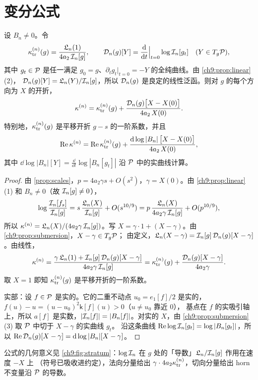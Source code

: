 \section{变分公式}\label{ch9:sec:formula}

\begin{theorem}[变分公式]\label{thm:variation}
设 $B_n\ne0$。令
\[
 \kappa_{\mathrm{tr}}^{(n)}(g)=\frac{\mathfrak L_n(1)}{4a_2\,\mathcal I_n[g]},\qquad
 \mathcal D_n(g)[Y]=\frac{\mathrm{d}}{\mathrm{d} t}\Big|_{t=0}\log\mathcal I_n[g_t]\quad(Y\in T_g\mathcal P),
\]
其中 $g_t\in\mathcal P$ 是任一满足 $g_0=g$、$\partial_tg_t|_{t=0}=-Y$ 的全纯曲线。由 \cref{ch9:prop:linear}(2)，
$\mathcal D_n(g)[Y]=\mathfrak L_n(Y)/\mathcal I_n[g]$，所以 $\mathcal D_n(g)$ 是良定的线性泛函。则对 $g$ 的每个方向为 $X$ 的开折，
\[
 \kappa^{(n)}=\kappa_{\mathrm{tr}}^{(n)}(g)+\frac{\mathcal D_n(g)\bigl[X-X(0)\bigr]}{4a_2\,X(0)} .
\]
特别地，$\kappa_{\mathrm{tr}}^{(n)}(g)$ 是平移开折 $g-s$ 的一阶系数，并且
\[
 \operatorname{Re}\kappa^{(n)}=\operatorname{Re}\kappa_{\mathrm{tr}}^{(n)}(g)+\frac{\mathrm{d}\log|B_n|\,\bigl[X-X(0)\bigr]}{4a_2\,X(0)},
\]
其中 $\dd\log|B_n|[Y]=\frac{\dd}{\dd t}\log|B_n[g_t]|$ 沿 $\mathcal P$ 中的实曲线计算。
\end{theorem}

\begin{proof}
由 \cref{prop:scales}，$p=4a_2\gamma s+O(s^2)$，$\gamma=X(0)$。由 \cref{ch9:prop:linear}(1) 和 $B_n\ne0$（故 $\mathcal I_n[g]\ne0$），
\[
 \log\frac{\mathcal I_n[f_s]}{\mathcal I_n[g]}=s\,\frac{\mathfrak L_n(X)}{\mathcal I_n[g]}+O(s^{10/9})=p\,\frac{\mathfrak L_n(X)}{4a_2\gamma\,\mathcal I_n[g]}+O(p^{10/9}),
\]
所以 $\kappa^{(n)}=\mathfrak L_n(X)/(4a_2\gamma\,\mathcal I_n[g])$。写 $X=\gamma\cdot1+(X-\gamma)$。由 \cref{ch9:prop:submersion}，$X-\gamma\in T_g\mathcal P$；
由定义，$\mathfrak L_n(X-\gamma)=\mathcal I_n[g]\,\mathcal D_n(g)[X-\gamma]$。由线性，
\[
 \kappa^{(n)}=\frac{\gamma\,\mathfrak L_n(1)+\mathcal I_n[g]\,\mathcal D_n(g)[X-\gamma]}{4a_2\gamma\,\mathcal I_n[g]}
 =\kappa_{\mathrm{tr}}^{(n)}(g)+\frac{\mathcal D_n(g)[X-\gamma]}{4a_2\gamma}.
\]
取 $X=1$ 即知 $\kappa_{\mathrm{tr}}^{(n)}(g)$ 是平移开折的一阶系数。

实部：设 $f\in\mathcal P$ 是实的。它的二重不动点 $u_0=e_1[f]/2$ 是实的，$f(u)-u=(u-u_0)^2\mathsf k[f](u)>0$（$u\ne u_0$ 靠近 $0$），
基点在 $f$ 的实吸引轴上，所以 $a[f]$ 是实数，$|\mathcal I_n[f]|=|B_n[f]|$。对实的 $X$，由 \cref{ch9:prop:submersion}(3) 取 $\mathcal P$ 中切于 $X-\gamma$ 的实曲线 $g_t$。
沿这条曲线 $\operatorname{Re}\log\mathcal I_n[g_t]=\log|B_n[g_t]|$，所以 $\operatorname{Re}\mathcal D_n(g)[X-\gamma]=\mathrm{d}\log|B_n|[X-\gamma]$。
\end{proof}

公式的几何意义见 \cref{ch9:fig:stratum}：$\log\mathcal I_n$ 在 $g$ 处的「导数」$\mathfrak L_n/\mathcal I_n[g]$ 作用在速度 $-X$ 上
（符号已吸收进约定），法向分量给出 $\gamma\cdot4a_2\kappa_{\mathrm{tr}}^{(n)}$，切向分量给出 horn 不变量沿 $\mathcal P$ 的导数。

